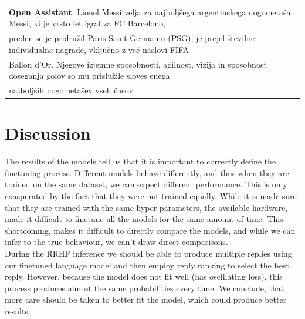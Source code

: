 \documentclass[fleqn,moreauthors,10pt]{ds_report}
\begin{document}
\begin{table}[hbt]
{\begin{tabular}{l}
            \textbf{Open Assistant}: Lionel Messi velja za najboljšega argentinskega nogometaša. Messi, ki je vrsto let igral za FC Barcelono,\\ preden se je pridružil Paris Saint-Germainu (PSG), je prejel številne individualne nagrade, vključno z več naslovi FIFA\\ Ballon d'Or. Njegove izjemne sposobnosti, agilnost, vizija in sposobnost doseganja golov so mu prislužile sloves enega\\ najboljših nogometašev vseh časov.

            
            
    	\end{tabular}
        }
    	\label{tab:results_qualitative}
    \end{table}


\section*{Discussion}
    The results of the models tell us that it is important to correctly define the finetuning process. Different models behave differently, and thus when they are trained on the same dataset, we can expect different performance. This is only exasperated by the fact that they were not trained equally. While it is made sure that they are trained with the same hyper-parameters, the available hardware, made it difficult to finetune all the models for the same amount of time. This shortcoming, makes it difficult to directly compare the models, and while we can infer to the true behaviour, we can't draw direct comparisons.\\
    During the RRHF inference we should be able to produce multiple replies using our finetuned language model and then employ reply ranking to select the best reply. However, because the model does not fit well (has oscillating loss), this process produces almost the same probabilities every time. We conclude, that more care should be taken to better fit the model, which could produce better results.  

\end{document}
